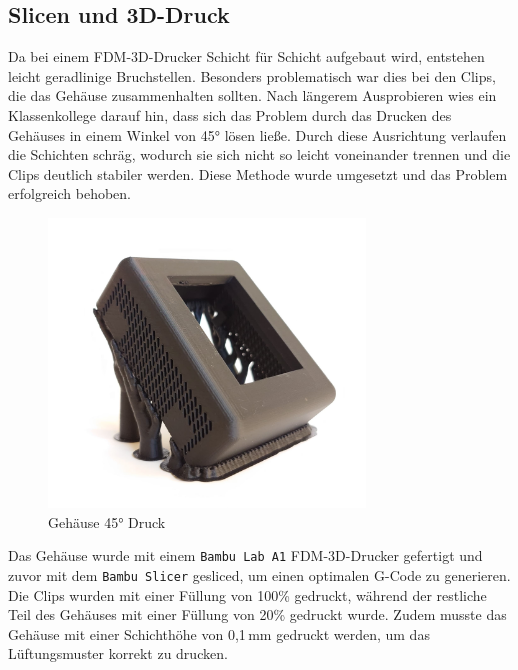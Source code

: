 \begin{inhalt}
\section{Slicen und 3D-Druck}

Da bei einem FDM-3D-Drucker Schicht für Schicht aufgebaut wird, entstehen leicht geradlinige Bruchstellen.  
Besonders problematisch war dies bei den Clips, die das Gehäuse zusammenhalten sollten.  
Nach längerem Ausprobieren wies ein Klassenkollege darauf hin, dass sich das Problem durch das Drucken des Gehäuses in einem Winkel von 45° lösen ließe.  
Durch diese Ausrichtung verlaufen die Schichten schräg, wodurch sie sich nicht so leicht voneinander trennen und die Clips deutlich stabiler werden.  
Diese Methode wurde umgesetzt und das Problem erfolgreich behoben.


\begin{figure}[!htb]
\centering
\includegraphics[width=0.75\textwidth]{files/Thomas/pics/geheause/gehaeuese_45_Grad_druck.png}
\caption[Gehäuse 45° Druck]{Gehäuse 45° Druck}
\label{fig:gehaeuse_internet_bild}
\end{figure}

Das Gehäuse wurde mit einem \texttt{Bambu Lab A1} FDM-3D-Drucker gefertigt und zuvor mit dem \texttt{Bambu Slicer} gesliced, um einen optimalen G-Code zu generieren.  
Die Clips wurden mit einer Füllung von 100\% gedruckt, während der restliche Teil des Gehäuses mit einer Füllung von 20\% gedruckt wurde.  
Zudem musste das Gehäuse mit einer Schichthöhe von 0{,}1\,mm gedruckt werden, um das Lüftungsmuster korrekt zu drucken.


\end{inhalt}